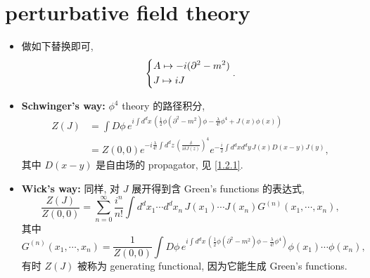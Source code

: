 \section{perturbative field theory}
\begin{itemize}
	\item 做如下替换即可,
	\begin{equation}
		\begin{dcases}
			A \mapsto - i (\partial^2 - m^2) \\
			J \mapsto i J
		\end{dcases}.
	\end{equation}
	
	\item \textbf{Schwinger's way:} $\phi^4$ theory 的路径积分,
	\begin{align}
		Z(J) &= \int D\phi \, e^{i \int d^d x \, (\frac{1}{2} \phi (\partial^2 - m^2) \phi - \frac{\lambda}{4!} \phi^4 + J(x) \phi(x))} \\
		&= Z(0, 0) e^{- i \frac{\lambda}{4!} \int d^d z \, (\frac{\delta}{i \delta J(z)})^4} e^{- \frac{i}{2} \int d^d x d^d y \, J(x) D(x - y) J(y)},
	\end{align}
	其中 $D(x - y)$ 是自由场的 propagator, 见 \eqref{1.2.1}.
	
	\item \textbf{Wick's way:} 同样, 对 $J$ 展开得到含 Green's functions 的表达式,
	\begin{equation}
		\frac{Z(J)}{Z(0, 0)} = \sum_{n = 0}^\infty \frac{i^n}{n!} \int d^d x_1 \cdots d^d x_n \, J(x_1) \cdots J(x_n) G^{(n)}(x_1, \cdots, x_n),
	\end{equation}
	其中
	\begin{equation} \label{3.3.5}
		G^{(n)}(x_1, \cdots, x_n) = \frac{1}{Z(0, 0)} \int D\phi \, e^{i \int d^d x \, (\frac{1}{2} \phi (\partial^2 - m^2) \phi - \frac{\lambda}{4!} \phi^4)} \phi(x_1) \cdots \phi(x_n),
	\end{equation}
	有时 $Z(J)$ 被称为 generating functional, 因为它能生成 Green's functions.
\end{itemize}

